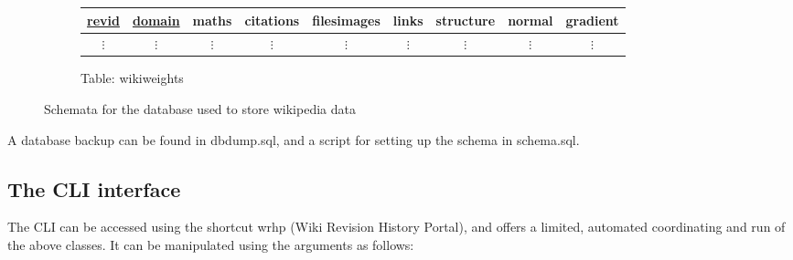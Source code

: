 \begin{figure}
\begin{subfigure}[b!]{\linewidth}
    \centering
    \begin{tabular}{ccccccccc}
      \toprule
      \underline{revid} & \underline{domain} & maths & citations & filesimages & links &
      structure & normal & gradient\\
      \midrule
      $\vdots$ & $\vdots$ & $\vdots$ & $\vdots$ & $\vdots$ & $\vdots$ &
      $\vdots$ & $\vdots$ & $\vdots$ \\
    \end{tabular}
    \caption{Table: wikiweights} 
  \end{subfigure}
  \caption{Schemata for the database used to store wikipedia data}
  \label{database-schema}
\end{figure}

A database backup can be found in dbdump.sql, and a script for setting
up the schema in schema.sql.

\clearpage

\subsection*{The CLI interface}
The CLI can be accessed using the shortcut wrhp (Wiki Revision History
Portal), and offers a limited, automated coordinating and run of
the above classes. It can be manipulated using the arguments as follows:

